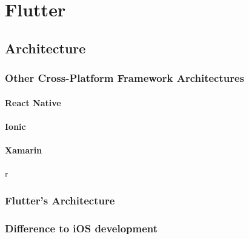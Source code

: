 \chapter{Flutter}

\section{Architecture}

\subsection{Other Cross-Platform Framework Architectures} \label{section::other_architectures}

\subsubsection{React Native}

\subsubsection{Ionic}

\subsubsection{Xamarin}
r
\subsection{Flutter's Architecture} \label{section::flutter_architecture}

\subsection{Difference to iOS development}